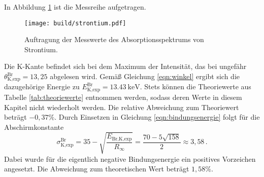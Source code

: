 In Abbildung \ref{fig:strontium} ist die Messreihe aufgetragen.

\begin{figure}
  \centering
  \texttt{[image: build/strontium.pdf]}
  \caption{Auftragung der Messwerte des Absorptionsspektrums von Strontium.}
  \label{fig:strontium}
\end{figure}

Die K-Kante befindet sich bei dem Maximum der Intensität, das bei ungefähr
$\theta_{\text{K,exp}}^{\text{Br}} = 13{,}25$ abgelesen wird. Gemäß Gleichung \eqref{eqn:winkel} ergibt sich die dazugehörige Energie
zu $E_{\text{K,exp}}^{\text{Br}} = \SI{13.43}{\kilo\electronvolt}$.
Stets können die Theoriewerte aus Tabelle \ref{tab:theoriewerte} entnommen werden,
sodass deren Werte in diesem Kapitel nicht wiederholt werden. Die relative Abweichung zum Theoriewert
beträgt $-0{,}37\%$. Durch Einsetzen in Gleichung \eqref{eqn:bindungsenergie}
folgt für die Abschirmkonstante
\begin{equation*}
  \sigma_{\text{K,exp}}^{\text{Br}} =  35 - \sqrt{\frac{E_{\text{Br,K,exp}}}{R_\infty}} = \frac{70-5\sqrt{158}}{2} \approx 3{,}58\,.
\end{equation*}
Dabei wurde für die eigentlich negative Bindungsenergie ein positives Vorzeichen angesetzt.
Die Abweichung zum theoretischen Wert beträgt $1{,}58\%$.
